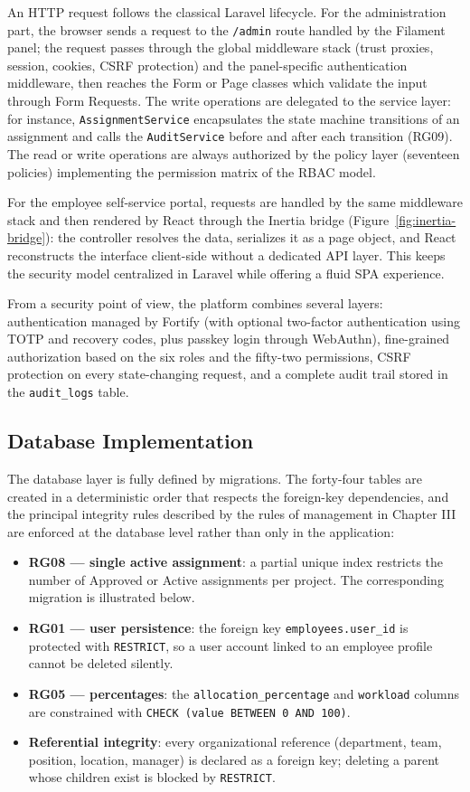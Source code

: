 \documentclass{bts-report}
\begin{document}
An HTTP request follows the classical Laravel lifecycle. For the administration part, the browser sends a request to the \texttt{/admin} route handled by the Filament panel; the request passes through the global middleware stack (trust proxies, session, cookies, CSRF protection) and the panel-specific authentication middleware, then reaches the Form or Page classes which validate the input through Form Requests. The write operations are delegated to the service layer: for instance, \texttt{AssignmentService} encapsulates the state machine transitions of an assignment and calls the \texttt{AuditService} before and after each transition (RG09). The read or write operations are always authorized by the policy layer (seventeen policies) implementing the permission matrix of the RBAC model.

For the employee self-service portal, requests are handled by the same middleware stack and then rendered by React through the Inertia bridge (Figure~\ref{fig:inertia-bridge}): the controller resolves the data, serializes it as a page object, and React reconstructs the interface client-side without a dedicated API layer. This keeps the security model centralized in Laravel while offering a fluid SPA experience.

From a security point of view, the platform combines several layers: authentication managed by Fortify (with optional two-factor authentication using TOTP and recovery codes, plus passkey login through WebAuthn), fine-grained authorization based on the six roles and the fifty-two permissions, CSRF protection on every state-changing request, and a complete audit trail stored in the \texttt{audit\_logs} table.

\subsection{Database Implementation}
The database layer is fully defined by migrations. The forty-four tables are created in a deterministic order that respects the foreign-key dependencies, and the principal integrity rules described by the rules of management in Chapter III are enforced at the database level rather than only in the application:

\begin{itemize}
  \item \textbf{RG08 --- single active assignment}: a partial unique index restricts the number of Approved or Active assignments per project. The corresponding migration is illustrated below.
  \item \textbf{RG01 --- user persistence}: the foreign key \texttt{employees.user\_id} is protected with \texttt{RESTRICT}, so a user account linked to an employee profile cannot be deleted silently.
  \item \textbf{RG05 --- percentages}: the \texttt{allocation\_percentage} and \texttt{workload} columns are constrained with \texttt{CHECK (value BETWEEN 0 AND 100)}.
  \item \textbf{Referential integrity}: every organizational reference (department, team, position, location, manager) is declared as a foreign key; deleting a parent whose children exist is blocked by \texttt{RESTRICT}.
\end{itemize}
\end{document}
